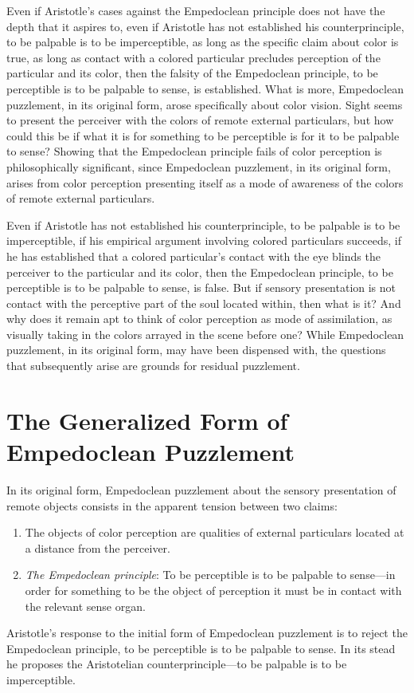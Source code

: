 Even if Aristotle's cases against the Empedoclean principle does not have the depth that it aspires to, even if Aristotle has not established his counterprinciple, to be palpable is to be imperceptible, as long as the specific claim about color is true, as long as contact with a colored particular precludes perception of the particular and its color, then the falsity of the Empedoclean principle, to be perceptible is to be palpable to sense, is established. What is more, Empedoclean puzzlement, in its original form, arose specifically about color vision. Sight seems to present the perceiver with the colors of remote external particulars, but how could this be if what it is for something to be perceptible is for it to be palpable to sense? Showing that the Empedoclean principle fails of color perception is philosophically significant, since Empedoclean puzzlement, in its original form, arises from color perception presenting itself as a mode of awareness of the colors of remote external particulars. 

Even if Aristotle has not established his counterprinciple, to be palpable is to be imperceptible, if his empirical argument involving colored particulars succeeds, if he has established that a colored particular's contact with the eye blinds the perceiver to the particular and its color, then the Empedoclean principle, to be perceptible is to be palpable to sense, is false. But if sensory presentation is not contact with the perceptive part of the soul located within, then what is it? And why does it remain apt to think of color perception as mode of assimilation, as visually taking in the colors arrayed in the scene before one? While Empedoclean puzzlement, in its original form, may have been dispensed with, the questions that subsequently arise are grounds for residual puzzlement.


\section{The Generalized Form of Empedoclean Puzzlement} %
\label{sec:the_generalized_form_of_empedoclean_puzzlement}

In its original form, Empedoclean puzzlement about the sensory presentation of remote objects consists in the apparent tension between two claims:
\begin{enumerate}[(1)]
    \item The objects of color perception are qualities of external particulars located at a distance from the perceiver.
    \item \emph{The Empedoclean principle}: To be perceptible is to be palpable to sense---in order for something to be the object of perception it must be in contact with the relevant sense organ.
\end{enumerate}
Aristotle's response to the initial form of Empedoclean puzzlement is to reject the Empedoclean principle, to be perceptible is to be palpable to sense. In its stead he proposes the Aristotelian counterprinciple---to be palpable is to be imperceptible. 

